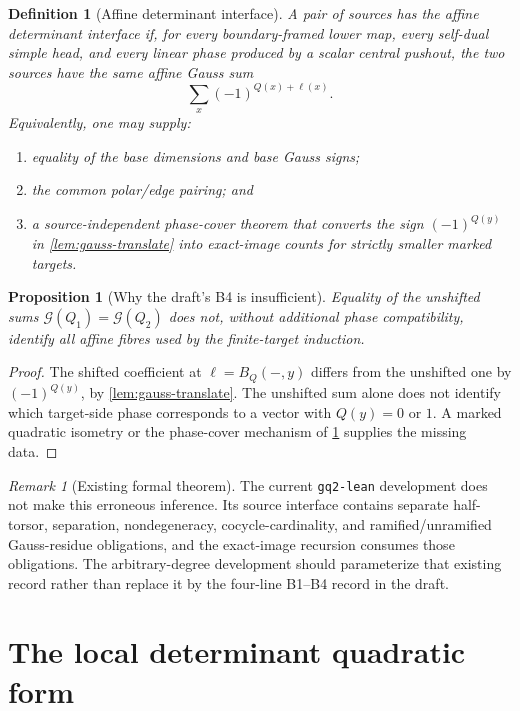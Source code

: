\documentclass[11pt,reqno]{amsart}
\newtheorem{proposition}[theorem]{Proposition}
\newtheorem{definition}[theorem]{Definition}
\theoremstyle{remark}
\newtheorem{remark}[theorem]{Remark}
\numberwithin{equation}{section}
\newcommand{\Gsum}{\mathcal G}
\begin{document}
\begin{definition}[Affine determinant interface]\label{def:affine-B4}
A pair of sources has the \emph{affine determinant interface} if, for
every boundary-framed lower map, every self-dual simple head, and every
linear phase produced by a scalar central pushout, the two sources have
the same affine Gauss sum
\[
 \sum_x(-1)^{Q(x)+\ell(x)}.
\]
Equivalently, one may supply:
\begin{enumerate}
\item equality of the base dimensions and base Gauss signs;
\item the common polar/edge pairing; and
\item a source-independent phase-cover theorem that converts the sign
\((-1)^{Q(y)}\) in \cref{lem:gauss-translate} into exact-image counts for
strictly smaller marked targets.
\end{enumerate}
\end{definition}

\begin{proposition}[Why the draft's B4 is insufficient]
Equality of the unshifted sums \(\Gsum(Q_1)=\Gsum(Q_2)\) does not, without
additional phase compatibility, identify all affine fibres used by the
finite-target induction.
\end{proposition}

\begin{proof}
The shifted coefficient at \(\ell=B_Q(-,y)\) differs from the unshifted
one by \((-1)^{Q(y)}\), by \cref{lem:gauss-translate}.  The unshifted
sum alone does not identify which target-side phase corresponds to a
vector with \(Q(y)=0\) or \(1\).  A marked quadratic isometry or the
phase-cover mechanism of \cref{def:affine-B4} supplies the missing data.
\end{proof}

\begin{remark}[Existing formal theorem]
The current \texttt{gq2-lean} development does not make this erroneous
inference.  Its source interface contains separate half-torsor,
separation, nondegeneracy, cocycle-cardinality, and ramified/unramified
Gauss-residue obligations, and the exact-image recursion consumes those
obligations.  The arbitrary-degree development should parameterize that
existing record rather than replace it by the four-line B1--B4 record in
the draft.
\end{remark}

\section{The local determinant quadratic form}
\end{document}
